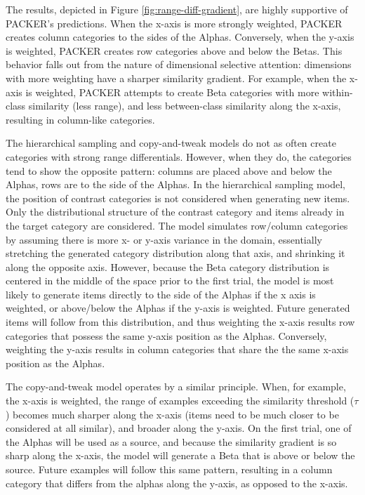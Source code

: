 \documentclass[10pt,letterpaper]{article}
\begin{document}
The results, depicted in Figure \ref{fig:range-diff-gradient}, are highly supportive of PACKER's predictions. When the x-axis is more strongly weighted, PACKER creates column categories to the sides of the Alphas. Conversely, when the y-axis is weighted, PACKER creates row categories above and below the Betas. This behavior falls out from the nature of dimensional selective attention: dimensions with more weighting have a sharper similarity gradient. For example, when the x-axis is weighted, PACKER attempts to create Beta categories with more within-class similarity (less range), and less between-class similarity along the x-axis, resulting in column-like categories.

The hierarchical sampling and copy-and-tweak models do not as often create categories with strong range differentials. However, when they do, the categories tend to show the opposite pattern: columns are placed above and below the Alphas, rows are to the side of the Alphas. In the hierarchical sampling model, the position of contrast categories is not considered when generating new items. Only the distributional structure of the contrast category and items already in the target category are considered. The model simulates row/column categories by assuming there is more x- or y-axis variance in the domain, essentially stretching the generated category distribution along that axis, and shrinking it along the opposite axis. However, because the Beta category distribution is centered in the middle of the space prior to the first trial, the model is most likely to generate items directly to the side of the Alphas if the x axis is weighted, or above/below the Alphas if the y-axis is weighted. Future generated items will follow from this distribution, and thus weighting the x-axis results row categories that possess the same y-axis position as the Alphas. Conversely, weighting the y-axis results in column categories that share the the same x-axis position as the Alphas.

The copy-and-tweak model operates by a similar principle. When, for example, the x-axis is weighted, the range of examples exceeding the similarity threshold ($\tau$) becomes much sharper along the x-axis (items need to be much closer to be considered at all similar), and broader along the y-axis. On the first trial, one of the Alphas will be used as a source, and because the similarity gradient is so sharp along the x-axis, the model will generate a Beta that is above or below the source. Future examples will follow this same pattern, resulting in a column category that differs from the alphas along the y-axis, as opposed to the x-axis.
\end{document}
